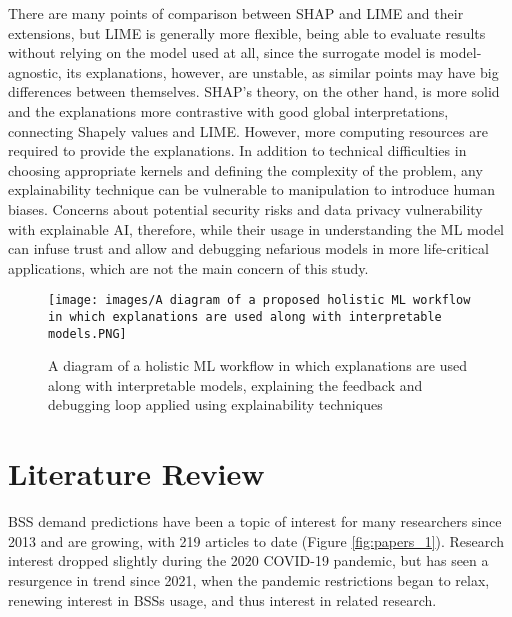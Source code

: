 \documentclass{article}
\begin{document}
There are many points of comparison between SHAP and LIME and their extensions, but LIME is generally more flexible, being able to evaluate results without relying on the model used at all, since the surrogate model is model-agnostic, its explanations, however, are unstable, as similar points may have big differences between themselves\cite{Molnar2020}. SHAP's theory, on the other hand, is more solid and the explanations more contrastive with good global interpretations, connecting Shapely values and LIME. However, more computing resources are required to provide the explanations\cite{Molnar2020}. In addition to technical difficulties in choosing appropriate
kernels and defining the complexity of the problem, any explainability technique can be vulnerable to manipulation to introduce human biases\cite{Molnar2020}\cite{Hall2019}. Concerns about potential security risks and data privacy vulnerability with explainable AI\cite{Hall2019}, therefore, while their usage in understanding the ML model can infuse trust and allow and debugging nefarious models in more life-critical applications\cite{Hall2019}, which are not the main concern of this study. 

\begin{figure}
\centering
\texttt{[image: images/A diagram of a proposed holistic ML workflow in which explanations are used along with interpretable models.PNG]}
\caption{A diagram of a holistic ML workflow in which explanations are used along with interpretable models\cite{Hall2019}, explaining the feedback and debugging loop applied using explainability techniques}
\label{fig:holistic_x_ml}
\end{figure}


\section{Literature Review}

BSS demand predictions have been a topic of interest for many researchers since 2013 and are growing, with 219 articles to date (Figure \ref{fig:papers_1}). Research interest dropped slightly during the 2020 COVID-19 pandemic, but has seen a resurgence in trend since 2021, when the pandemic restrictions began to relax, renewing interest in BSSs usage, and thus interest in related research.
\end{document}
